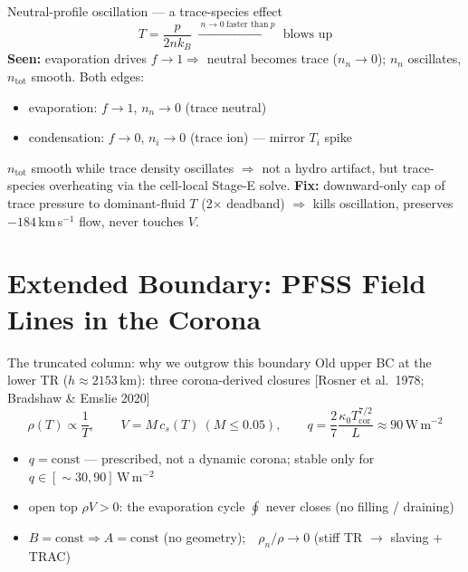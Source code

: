 \documentclass[aspectratio=169]{beamer}
\newcommand{\cit}[1]{{\scriptsize\color{gray}[#1]}}
\begin{document}
\begin{frame}{Neutral-profile oscillation — a trace-species effect}
  \[
    T=\frac{p}{2 n k_B}\ \xrightarrow{\ n\to0\ \text{faster than}\ p\ }\ \text{blows up}
  \]
  \textbf{Seen:} evaporation drives $f\to1\Rightarrow$ \alert{neutral becomes trace} ($n_n\to0$);
  $n_n$ oscillates, $n_\mathrm{tot}$ smooth. Both edges:
  \begin{itemize}\setlength\itemsep{2pt}
    \item evaporation: $f\to1$, $n_n\to0$ (trace neutral)
    \item condensation: $f\to0$, $n_i\to0$ (trace ion) — mirror $T_i$ spike
  \end{itemize}
  $n_\mathrm{tot}$ smooth while trace density oscillates $\Rightarrow$ \alert{not} a hydro artifact,
  but trace-species overheating via the cell-local Stage-E solve.
  \vfill
  \textbf{Fix:} downward-only cap of trace pressure to dominant-fluid $T$ (2$\times$ deadband)
  $\Rightarrow$ kills oscillation, preserves $-184$\,km\,s$^{-1}$ flow, never touches $V$.
\end{frame}

\section{Extended Boundary: PFSS Field Lines in the Corona}
\begin{frame}{The truncated column: why we outgrow this boundary}
  Old upper BC at the lower TR ($h\approx2153$\,km): three corona-derived closures
  \cit{Rosner et al.\ 1978; Bradshaw \& Emslie 2020}
  \[
    \rho(T)\propto\frac1T,\qquad
    V=M\,c_s(T)\ (M\!\le\!0.05),\qquad
    q=\frac{2}{7}\frac{\kappa_0 T_\mathrm{cor}^{7/2}}{L}\approx90\,\mathrm{W\,m^{-2}}
  \]
  \begin{itemize}\setlength\itemsep{4pt}
    \item $q=\text{const}$ — prescribed, not a dynamic corona; stable only for $q\in[{\sim}30,90]\,\mathrm{W\,m^{-2}}$
    \item open top $\rho V>0$: the evaporation cycle $\oint$ never closes (no filling / draining)
    \item $B=\text{const}\Rightarrow A=\text{const}$ (no geometry);\ \ $\rho_n/\rho\to0$ (stiff TR $\to$ slaving + TRAC)
  \end{itemize}
\end{frame}
\end{document}
